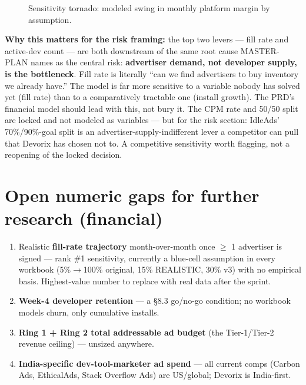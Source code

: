 \begin{figure}[htbp]
\centering
{}
\caption{Sensitivity tornado: modeled swing in monthly platform margin by assumption.}
\label{fig:sensitivity-tornado}
\end{figure}

\textbf{Why this matters for the risk framing:} the top two levers --- fill rate and active-dev count --- are both downstream of the same root cause MASTER-PLAN names as the central risk: \textbf{advertiser demand, not developer supply, is the bottleneck}. Fill rate is literally ``can we find advertisers to buy inventory we already have.'' The model is far more sensitive to a variable nobody has solved yet (fill rate) than to a comparatively tractable one (install growth). The PRD's financial model should lead with this, not bury it. The CPM rate and 50/50 split are locked and not modeled as variables --- but for the risk section: IdleAds' 70\%/90\%-goal split is an advertiser-supply-indifferent lever a competitor can pull that Devorix has chosen not to. A competitive sensitivity worth flagging, not a reopening of the locked decision.

\section{Open numeric gaps for further research (financial)}

\begin{enumerate}
  \item Realistic \textbf{fill-rate trajectory} month-over-month once \(\geq\) 1 advertiser is signed --- rank \#1 sensitivity, currently a blue-cell assumption in every workbook (5\%\(\to\)100\% original, 15\% REALISTIC, 30\% v3) with no empirical basis. Highest-value number to replace with real data after the sprint.
  \item \textbf{Week-4 developer retention} --- a \S 8.3 go/no-go condition; no workbook models churn, only cumulative installs.
  \item \textbf{Ring 1 + Ring 2 total addressable ad budget} (the Tier-1/Tier-2 revenue ceiling) --- unsized anywhere.
  \item \textbf{India-specific dev-tool-marketer ad spend} --- all current comps (Carbon Ads, EthicalAds, Stack Overflow Ads) are US/global; Devorix is India-first.
\end{enumerate}

